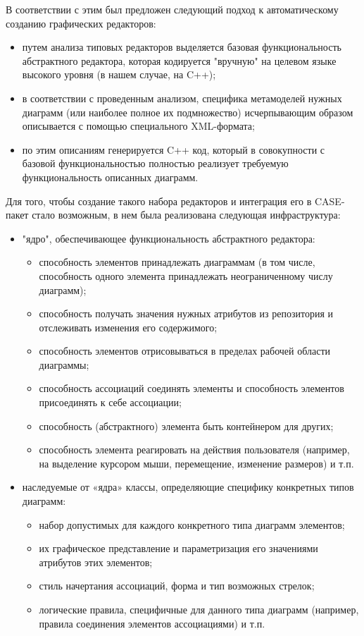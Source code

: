 \documentclass[a5paper]{article}
\begin{document}
В соответствии с этим был предложен следующий подход к автоматическому
созданию графических редакторов: 

\begin{itemize}
  \item путем анализа типовых редакторов выделяется базовая функциональность
	абстрактного редактора, которая кодируется "вручную" на целевом языке
	высокого уровня (в нашем случае, на C++);
  \item в соответствии с проведенным анализом, специфика метамоделей нужных
	диаграмм (или наиболее полное их подмножество) исчерпывающим образом
	описывается с помощью специального XML-формата;
  \item по этим описаниям генерируется C++ код,
	который в совокупности с базовой функциональностью полностью реализует
	требуемую функциональность описанных диаграмм.
\end{itemize}

Для того, чтобы создание такого набора редакторов и интеграция его в
CASE-пакет стало возможным, в нем была реализована следующая инфраструктура:

\begin{itemize}
  \item "ядро", обеспечивающее функциональность абстрактного редактора:
    \begin{itemize}
      \item способность элементов принадлежать диаграммам (в том числе, способность
	    одного элемента принадлежать неограниченному числу диаграмм);
	  \item способность получать значения нужных атрибутов из репозитория и
	    отслеживать изменения его содержимого;
	  \item способность элементов отрисовываться в пределах рабочей области
	    диаграммы;
	  \item способность ассоциаций соединять элементы и способность элементов
	    присоединять к себе ассоциации;
	  \item способность (абстрактного) элемента быть контейнером для других;
	  \item способность элемента реагировать на действия пользователя (например, на
	    выделение курсором мыши, перемещение, изменение размеров) и т.п.
    \end{itemize}
  \item наследуемые от «ядра» классы, определяющие специфику конкретных типов
	диаграмм:
	\begin{itemize}
	  \item набор допустимых для каждого конкретного типа диаграмм элементов;
	  \item их графическое представление и параметризация его значениями атрибутов
		этих элементов;
	  \item стиль начертания ассоциаций, форма и тип возможных стрелок;
	  \item логические правила, специфичные для данного типа диаграмм (например,
		правила соединения элементов ассоциациями) и т.п.
	\end{itemize}
\end{itemize}
\end{document}
